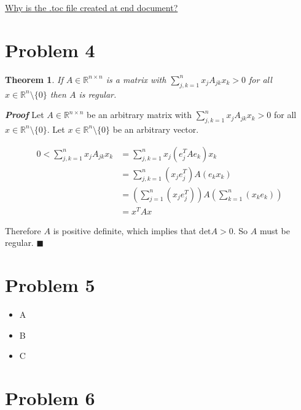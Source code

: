 \documentclass[12pt]{article}
\newtheorem{theorem}{Theorem}
\newenvironment{proof}{\textit{\textbf{Proof}}}{\hfill$\blacksquare$}
\newenvironment{myitemize}{%
	\begin{itemize}[label=$\spadesuit$]
		\let\olditem\item
		\renewcommand\item{\olditem}
	}{
	\end{itemize}
}
\begin{document}
\href{https://tex.stackexchange.com/questions/186674/why-is-the-toc-file-created-at-end-document}{Why is the .toc file created at end document?}

\section{Problem 4}
\begin{theorem}
	If $A \in \mathbb{R}^{n \times n}$ is a matrix with $\sum_{j,k=1}^{n}x_j A_{jk} x_k > 0$ for all $x \in \mathbb{R}^n \setminus \{0\}$ then $A$ is regular.
\end{theorem}

\begin{proof}
	Let $A \in \mathbb{R}^{n\times n}$ be an arbitrary matrix with $\sum_{j,k=1}^{n}x_j A_{jk} x_k > 0$ for all $x \in \mathbb{R}^n \setminus \{0\}$. Let $x \in \mathbb{R}^n \setminus \{0\}$ be an arbitrary vector.
	
	\begin{align*}
		0 < \sum_{j,k=1}^{n}x_j A_{jk} x_k &= \sum_{j,k=1}^{n}x_j (e_j^T A e_k) x_k \\
		&= \sum_{j,k=1}^{n}(x_j e_j^T) A (e_k x_k) \\
		&= \left(\sum_{j=1}^{n}(x_j e_j^T)\right) A \left(\sum_{k=1}^{n}(x_k e_k)\right) \\
		&= x^T A x
	\end{align*}

	Therefore $A$ is positive definite, which implies that $\mathrm{det}A > 0$. So $A$ must be regular.
\end{proof}

\section{Problem 5}
\begin{myitemize}
	\item A
	\item B
	\item C
\end{myitemize}

\section{Problem 6}
\end{document}
